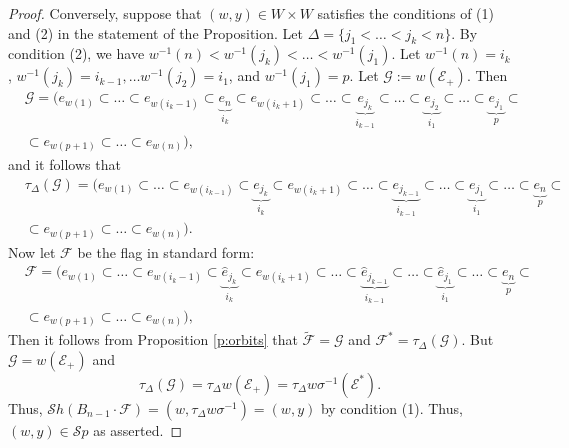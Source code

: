 \documentclass[12pt]{amsart}
\numberwithin{equation}{section}
\newcommand{\he}{\hat{e}}
\newcommand{\F}{\mathcal{F}}
\newcommand{\G}{\mathcal{G}}
\newcommand{\Sh}{\mathcal{S}h}
\newcommand{\Sp}{\mathcal{S}p}
\begin{document}
\begin{proof}
Conversely, suppose that $(w,y)\in W\times W$ satisfies the conditions of (1) and (2) in the statement of the Proposition.  
Let $\Delta=\{j_{1}<\dots< j_{k}<n\}$.  By condition (2), we have $w^{-1}(n)<w^{-1}(j_{k})<\dots< w^{-1}(j_{1})$.  
Let $w^{-1}(n)=i_{k}$, $w^{-1}(j_{k})=i_{k-1}, \dots w^{-1}(j_{2})=i_{1}$, and $w^{-1}(j_{1})=p$.  Let $\mathcal{G}:=w(\mathcal{E}_{+})$.  
Then 
\begin{equation*}
\begin{split}
&\mathcal{G}=
(e_{w(1)}\subset\dots\subset e_{w(i_{k}-1)}\subset\underbrace{e_{n}}_{i_{k}}\subset e_{w(i_{k}+1)}\subset \dots\subset \underbrace{e_{j_{k}}}_{i_{k-1}}\subset\dots\subset \underbrace{e_{j_{2}}}_{i_{1}}\subset \dots\subset\underbrace{e_{j_{1}}}_{p}\subset\\
&\subset e_{w(p+1)}\subset\dots\subset e_{w(n)}),
\end{split}
\end{equation*}
and it follows that 
\begin{equation*}
\begin{split}
&\tau_{\Delta} (\mathcal{G})=(e_{w(1)}\subset \dots\subset e_{w(i_{k-1})}\subset \underbrace{e_{j_{k}}}_{i_{k}}\subset e_{w(i_{k}+1)}\subset \dots\subset \underbrace{e_{j_{k-1}}}_{i_{k-1}}\subset \dots\subset \underbrace{e_{j_{1}}}_{i_{1}}\subset \dots\subset\underbrace{e_{n}}_{p}\subset\\ &\subset e_{w(p+1)} 
\subset \dots\subset e_{w(n)}).
\end{split}
\end{equation*}
Now let $\F$ be the flag in standard form:
\begin{equation*}
\begin{split}
&\F=(e_{w(1)}\subset\dots\subset e_{w(i_{k}-1)}\subset\underbrace{ \he_{j_{k}}}_{i_{k}}\subset e_{w(i_{k}+1)}\subset \dots \subset \underbrace{\he_{j_{k-1}}}_{i_{k-1}}\subset \dots \subset \underbrace{\he_{j_{1}}}_{i_{1}}\subset \dots\subset \underbrace{e_{n}}_{p}\subset\\
&\subset e_{w(p+1)}\subset \dots\subset e_{w(n)}),
\end{split}
\end{equation*}
Then it follows from Proposition \ref{p:orbits} that $\tilde{\F}=\mathcal{G}$ and $\F^{*}=\tau_{\Delta}(\G)$.  
But $\G=w(\mathcal{E}_{+})$ and $$\tau_{\Delta}(\G)=\tau_{\Delta}w(\mathcal{E}_{+})=\tau_{\Delta}w\sigma^{-1}(\mathcal{E}^{*}).$$  
Thus, $\Sh(B_{n-1}\cdot \F)=(w, \tau_{\Delta}w\sigma^{-1})=(w,y)$ by condition (1).  
Thus, $(w,y)\in \Sp$ as asserted. 
\end{proof}
\end{document}
